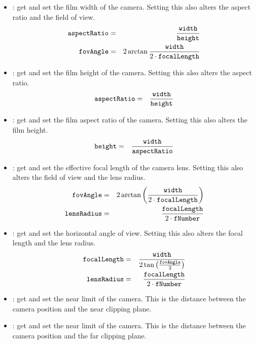 \begin{itemize}
 	\item {}:
 	  get and set the film width of the camera.  Setting this also alters the aspect ratio and the field of view.
	  \begin{eqnarray}
	  	\kw{aspectRatio} &=& \frac{\kw{width}}{\kw{height}}\\
	  	\kw{fovAngle} &=& 2 \arctan \frac{\kw{width}}{2 \cdot \kw{focalLength}}
	  \end{eqnarray}

 	\item {}:
 	  get and set the film height of the camera.  Setting this also alters the aspect ratio.
	  \begin{eqnarray}
	  	\kw{aspectRatio} &=& \frac{\kw{width}}{\kw{height}}
	  \end{eqnarray}

 	\item {}:
 	  get and set the film aspect ratio of the camera.  Setting this also alters the film height.
	  \begin{eqnarray}
	  	\kw{height} &=& \frac{\kw{width}}{\kw{aspectRatio}}
	  \end{eqnarray}

 	\item {}:
 	  get and set the effective focal length of the camera lens.  Setting this also alters the field of view and the lens radius.
	  \begin{eqnarray}
	  	\kw{fovAngle} &=& 2 \arctan \left(\frac{\kw{width}}{2 \cdot \kw{focalLength}}\right)\\
	  	\kw{lensRadius} &=& \frac{\kw{focalLength}}{2 \cdot \kw{fNumber}}
	  \end{eqnarray}

 	\item {}:
 	  get and set the horizontal angle of view.  Setting this also alters the focal length and the lens radius.
	  \begin{eqnarray}
	  	\kw{focalLength} &=& \frac{\kw{width}}{2 \tan \left(\frac{\kw{fovAngle}}{2}\right)}\\
	  	\kw{lensRadius} &=& \frac{\kw{focalLength}}{2 \cdot \kw{fNumber}}
	  \end{eqnarray}

 	\item {}:
 	  get and set the near limit of the camera.  This is the distance between the camera position and the near clipping plane.

 	\item {}:
 	  get and set the near limit of the camera.  This is the distance between the camera position and the far clipping plane.


\end{itemize}
